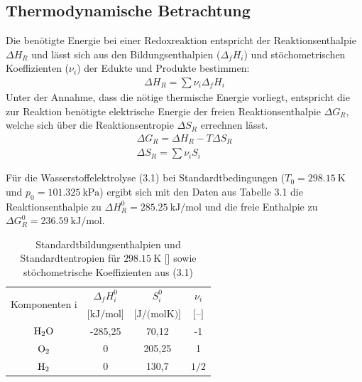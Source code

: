 \subsection{Thermodynamische Betrachtung}
\label{subsec:Energetische Betrachtung der Wasserelektrolyse}
Die benötigte Energie bei einer Redoxreaktion entspricht der Reaktionsenthalpie $\Delta H_R$ und lässt sich aus den Bildungsenthalpien ($\Delta_f H_i$) und stöchometrischen Koeffizienten ($\nu_i$) der Edukte und Produkte bestimmen:
\begin{align}
 	\Delta H_R = \sum{\nu_i \Delta_f H_i}
\end{align}
Unter der Annahme, dass die nötige thermische Energie vorliegt, entspricht die zur Reaktion benötigte elektrische Energie  der freien Reaktionsenthalpie $\Delta G_R$, welche sich über die Reaktionsentropie $\Delta S_R$ errechnen lässt.
\begin{align}
	\Delta G_R = \Delta H_R - T\Delta S_R \\
 	\Delta S_R = \sum{\nu_i S_i}
\end{align}

Für die Wasserstoffelektrolyse (3.1) bei Standardtbedingungen ($T_0 = \SI{298,15}{\kelvin}$ und $p_0 = \SI{101,325}{\kilo\pascal}$) ergibt sich mit den Daten aus Tabelle 3.1 die Reaktionsenthalpie zu $\Delta H^0_R = \SI{285,25}{\kilo\J\per\mol}$ und die freie Enthalpie zu $\Delta G^0_R = \SI{236,59}{\kilo\J\per\mol}$. 
\begin{table}[ht]
		\centering
		\caption{Standardtbildungsenthalpien und Standardtentropien für $\SI{298,15}{\kelvin}$ [\cite{?%
		}] sowie stöchometrische Koeffizienten aus (3.1)}
		\begin{tabular}{c c c c}
		\toprule
		\multirow{2}{*}{Komponenten i} & 
		\multicolumn{1}{c}{$\Delta_f H^0_i$} & 
		\multicolumn{1}{c}{$S^0_i$} &
		\multicolumn{1}{c}{$\nu_i$}
		\\
		& 
		\multicolumn{1}{c}{$\textrm{[kJ/mol]}$}& 
		\multicolumn{1}{c}{$\textrm{[J/(molK)]}$} &
		\multicolumn{1}{c}{$\textrm{[--]}$}
		\\
		\midrule
		$\ce{H2O}$ & -285,25 & 70,12 & -1\\
		$\ce{O2}$ & 0 & 205,25 & 1\\
		$\ce{H2}$ & 0 & 130,7 & $\textrm{1/2}$\\
		\bottomrule
		\end{tabular}
		\label{tab:rule}
		\end{table}	
			

